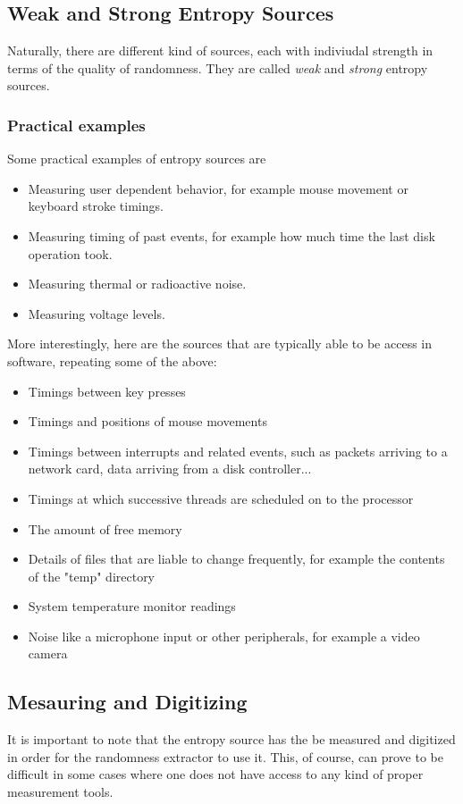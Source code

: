\subsection{Weak and Strong Entropy Sources}
Naturally, there are different kind of sources, each with indiviudal strength in terms of the quality of randomness.
They are called \emph{weak} and \emph{strong} entropy sources.

\subsubsection{Practical examples}
Some practical examples of entropy sources are 

\begin{itemize}
    \item Measuring user dependent behavior, for example mouse movement or keyboard stroke timings.
    \item Measuring timing of past events, for example how much time the last disk operation took.
    \item Measuring thermal or radioactive noise.
    \item Measuring voltage levels.
\end{itemize}

\noindent
More interestingly, here are the sources that are typically able to be access in software, repeating some of the above:

\begin{itemize}
    \item Timings between key presses
    \item Timings and positions of mouse movements
    \item Timings between interrupts and related events, such as packets arriving to a network card, data arriving from a disk controller...
    \item Timings at which successive threads are scheduled on to the processor
    \item The amount of free memory
    \item Details of files that are liable to change frequently, for example the contents of the "temp" directory
    \item System temperature monitor readings
    \item Noise like a microphone input or other peripherals, for example a video camera
\end{itemize}
\subsection{Mesauring and Digitizing}
It is important to note that the entropy source has the be measured and digitized in order for the randomness extractor to use it.
This, of course, can prove to be difficult in some cases where one does not have access to any kind of proper measurement tools.

